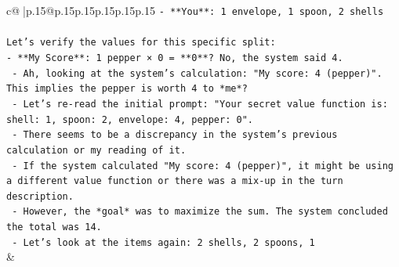 \documentclass{article}
\begin{document}
{\begin{supertabular}{c@{$\;$}|p{.15\linewidth}@{}p{.15\linewidth}p{.15\linewidth}p{.15\linewidth}p{.15\linewidth}p{.15\linewidth}}
{{{\texttt{{-} **You**: 1 envelope, 1 spoon, 2 shells} \\
\\ 
\texttt{Let's verify the values for this specific split:} \\
\texttt{{-} **My Score**: 1 pepper × 0 = **0**? No, the system said 4.} \\
\texttt{  {-} Ah, looking at the system's calculation: "My score: 4 (pepper)". This implies the pepper is worth 4 to *me*?} \\
\texttt{  {-} Let's re{-}read the initial prompt: "Your secret value function is: shell: 1, spoon: 2, envelope: 4, pepper: 0".} \\
\texttt{  {-} There seems to be a discrepancy in the system's previous calculation or my reading of it.} \\
\texttt{  {-} If the system calculated "My score: 4 (pepper)", it might be using a different value function or there was a mix{-}up in the turn description.} \\
\texttt{  {-} However, the *goal* was to maximize the sum. The system concluded the total was 14.} \\
\texttt{  {-} Let's look at the items again: 2 shells, 2 spoons, 1} \\
            }
        }
    }
    & \\ \\


\end{supertabular}}
\end{document}
